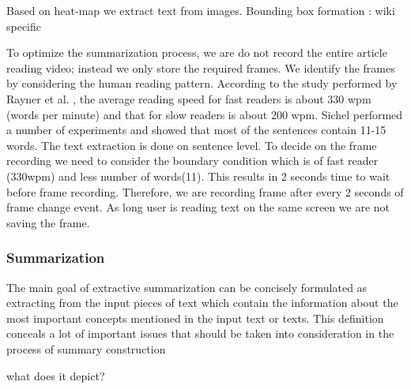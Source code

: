 \documentclass[12pt]{article}
\begin{document}
Based on heat-map we extract text from images. Bounding box formation : wiki specific


To optimize the summarization process, we are do not record the entire article reading video; instead we only store the required frames. We identify the frames by considering the human reading pattern. According to the study performed by Rayner et al. \cite{rayner2010eye}, the average reading speed for fast readers is about 330 wpm (words per minute) and that for slow readers is about 200 wpm. Sichel \cite{sichel1974distribution} performed a number of experiments and showed that most of the sentences contain 11-15 words. The text extraction is done on sentence level. To decide on the frame recording we need to consider the boundary condition which is of fast reader (330wpm) and less number of words(11). This results in 2 seconds time to wait before frame recording. Therefore, we are recording frame after every 2 seconds of frame change event. As long user is reading text on the same screen we are not saving the frame.

        
        
\subsubsection{Summarization}


The main goal of extractive summarization can be
concisely formulated as extracting from the input
pieces of text which contain the information about
the most important concepts mentioned in the input
text or texts. This definition conceals a lot of important issues that should be taken into consideration
in the process of summary construction

what does it depict?


\end{document}
